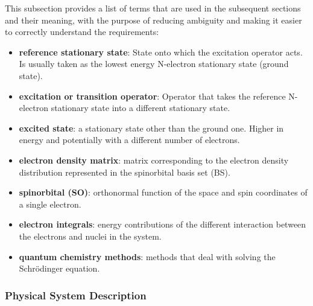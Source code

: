 \documentclass[12pt]{article}
\begin{document}

This subsection provides a list of terms that are used in the subsequent
sections and their meaning, with the purpose of reducing ambiguity and making it
easier to correctly understand the requirements:

\begin{itemize}

\item \textbf{reference stationary state}: State onto which the excitation 
operator acts. Is usually taken as the lowest energy N-electron stationary 
state (ground 
state).
\item \textbf{excitation or transition operator}: Operator that takes the 
reference N-electron stationary state into a different stationary state.
\item \textbf{excited state}: a stationary state other than the ground one. 
Higher in 
energy and potentially with a different number of electrons.
\item \textbf{electron density matrix}: matrix corresponding to the electron 
density distribution represented in the spinorbital basis set (BS).
\item \textbf{spinorbital (SO)}: orthonormal function of the space and spin 
coordinates of a single electron.
\item \textbf{electron integrals}: energy contributions of the different 
interaction between the electrons and nuclei in the system.
\item \textbf{quantum chemistry methods}: methods that deal with solving the 
Schr\"odinger equation.

\end{itemize}

\subsubsection{Physical System Description} \label{sec_phySystDescrip}

\end{document}
